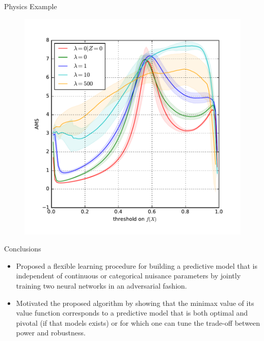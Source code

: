 \documentclass[final]{beamer}
\newcommand{\cmark}{\ding{51}}%
\begin{document}
\begin{frame}{}
\begin{textblock}{0.32}
\begin{block}{Physics Example \phantom{p}}
\begin{figure}
\begin{minipage}{.46\linewidth}
        \includegraphics[width=\textwidth]{figures/ams.pdf}\vspace{-1em}
\end{minipage}
\end{figure}

\end{block}

\vspace{0.5cm}
\begin{block}{Conclusions \phantom{p}}

\begin{itemize}
\item[{\color{green} \cmark}] Proposed a flexible learning procedure for building a
predictive model that is independent of continuous or categorical nuisance
parameters by jointly training two neural networks in an adversarial fashion.

\item[{\color{green} \cmark}] Motivated the proposed algorithm by showing
that the minimax value  of its value function corresponds to a predictive model
that is both optimal and pivotal (if that models exists) or for which one can
tune the trade-off between power and robustness. 


\end{itemize}
\end{block}
\end{textblock}
\end{frame}
\end{document}
